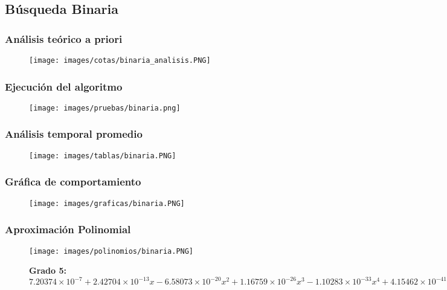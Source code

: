 \documentclass[12pt]{article}
\begin{document}
\newpage

	
		\subsection{Búsqueda Binaria}
			
			\subsubsection{Análisis teórico a priori}
			\begin{figure}[H]
			    	   \centering
			    	   \texttt{[image: images/cotas/binaria\_analisis.PNG]}
			    \end{figure}
			
			\subsubsection{Ejecución del algoritmo}
				\begin{figure}[H]
			    	   \centering
			    	   \texttt{[image: images/pruebas/binaria.png]}
			    \end{figure}
			
			\subsubsection{Análisis temporal promedio}
				\begin{figure}[H]
			    	   \centering
			    	   \texttt{[image: images/tablas/binaria.PNG]}
			    \end{figure}
			
			\subsubsection{Gráfica de comportamiento}
				\begin{figure}[H]
			    	   \centering
			    	   \texttt{[image: images/graficas/binaria.PNG]}
			    \end{figure}
			
			\subsubsection{Aproximación Polinomial}
				\begin{figure}[H]
			    	   \centering
			    	   \texttt{[image: images/polinomios/binaria.PNG]}
			    	   \caption*{\textbf{Grado 5: $7.20374\times10^{-7} + 2.42704\times10^{-13} x - 6.58073\times10^{-20} x^2 + 
			            1.16759\times10^{-26} x^3 - 1.10283\times10^{-33} x^4 + 4.15462\times10^{-41} x^5$}}
			    \end{figure}
			
\end{document}
